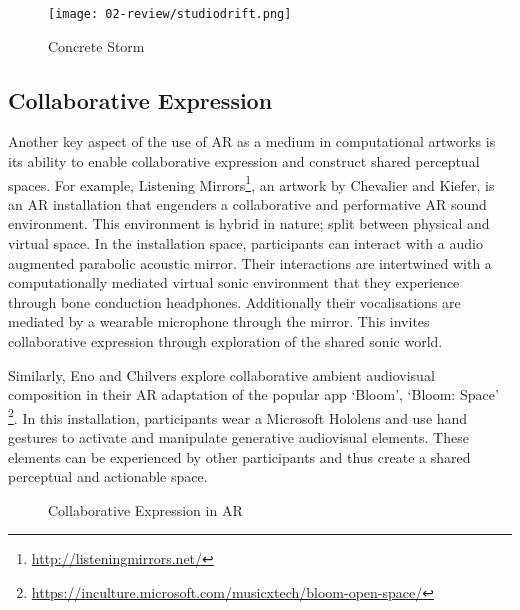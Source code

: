 \begin{figure}[bth]
    \myfloatalign
    {\texttt{[image: 02-review/studiodrift.png]}}
    \caption[Concrete Storm]{Concrete Storm}
\end{figure}\label{fig: concretestorm}

\subsection{Collaborative Expression}\label{sec: ar-arts-collaboration}
Another key aspect of the use of AR as a medium in computational artworks is its ability to enable collaborative expression and construct shared perceptual spaces. For example, Listening Mirrors\footnote{\url{http://listeningmirrors.net/}}, an artwork by Chevalier and Kiefer, \citeyearpar{chevalier2018} is an AR installation that engenders a collaborative and performative AR sound environment. This environment is hybrid in nature; split between physical and virtual space. In the installation space, participants can interact with a audio augmented parabolic acoustic mirror. Their interactions are intertwined with a computationally mediated virtual sonic environment that they experience through bone conduction headphones. Additionally their vocalisations are mediated by a wearable microphone through the mirror. This invites collaborative expression through exploration of the shared sonic world.

Similarly, Eno and Chilvers explore collaborative ambient audiovisual composition in their AR adaptation of the popular app `Bloom', `Bloom: Space' \footnote{\url{https://inculture.microsoft.com/musicxtech/bloom-open-space/}}. In this installation, participants wear a Microsoft Hololens and use hand gestures to activate and manipulate generative audiovisual elements. These elements can be experienced by other participants and thus create a shared perceptual and actionable space.

\begin{figure}
    \centering
    \hfill
    \caption{Collaborative Expression in AR}
    \label{fig: collaborativeARt}
\end{figure}

